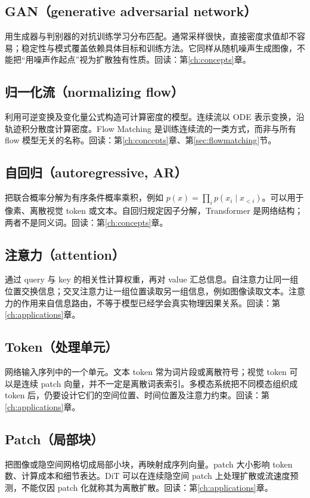 \subsection*{GAN（generative adversarial network）}\label{gl:gan}
用生成器与判别器的对抗训练学习分布匹配。通常采样很快，直接密度求值却不容易；稳定性与模式覆盖依赖具体目标和训练方法。它同样从随机噪声生成图像，不能把“用噪声作起点”视为扩散独有性质。回读：第\ref{ch:concepts}章。

\subsection*{归一化流（normalizing flow）}\label{gl:flow}
利用可逆变换及变化量公式构造可计算密度的模型。连续流以 ODE 表示变换，沿轨迹积分散度计算密度。Flow Matching 是训练连续流的一类方式，而非与所有 flow 模型无关的名称。回读：第\ref{ch:concepts}章、第\ref{sec:flowmatching}节。

\subsection*{自回归（autoregressive, AR）}\label{gl:ar}
把联合概率分解为有序条件概率乘积，例如 $p(x)=\prod_ip(x_i\mid x_{<i})$。可以用于像素、离散视觉 token 或文本。自回归规定因子分解，Transformer 是网络结构；两者不是同义词。回读：第\ref{ch:concepts}章。

\subsection*{注意力（attention）}\label{gl:attention}
通过 query 与 key 的相关性计算权重，再对 value 汇总信息。自注意力让同一组位置交换信息；交叉注意力让一组位置读取另一组信息，例如图像读取文本。注意力的作用来自信息路由，不等于模型已经学会真实物理因果关系。回读：第\ref{ch:applications}章。

\subsection*{Token（处理单元）}\label{gl:token}
网络输入序列中的一个单元。文本 token 常为词片段或离散符号；视觉 token 可以是连续 patch 向量，并不一定是离散词表索引。多模态系统把不同模态组织成 token 后，仍要设计它们的空间位置、时间位置及注意力约束。回读：第\ref{ch:applications}章。

\subsection*{Patch（局部块）}\label{gl:patch}
把图像或隐空间网格切成局部小块，再映射成序列向量。patch 大小影响 token 数、计算成本和细节表达。DiT 可以在连续隐空间 patch 上处理扩散或流速度预测，不能仅因 patch 化就称其为离散扩散。回读：第\ref{ch:applications}章。

